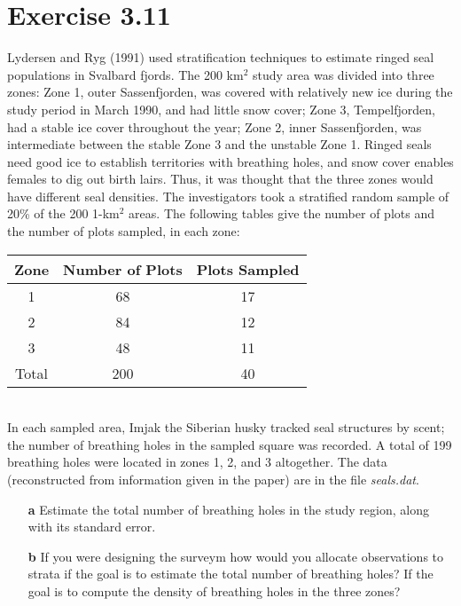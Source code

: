 \documentclass{article}\usepackage{graphicx, color}
\begin{document}
\section*{Exercise 3.11}
Lydersen and Ryg (1991) used stratification techniques to estimate ringed seal populations in Svalbard fjords. The 200 km${}^2$ study area was divided into three zones: Zone 1, outer Sassenfjorden, was covered with relatively new ice during the study period in March 1990, and had little snow cover; Zone 3, Tempelfjorden, had a stable ice cover throughout the year; Zone 2, inner Sassenfjorden, was intermediate between the stable Zone 3 and the unstable Zone 1. Ringed seals need good ice to establish territories with breathing holes, and snow cover enables females to dig out birth lairs. Thus, it was thought that the three zones would have different seal densities. The investigators took a stratified random sample of 20\% of the 200 1-km${}^2$ areas. The following tables give the number of plots and the number of plots sampled, in each zone:\\[10pt]
\begin{tabular}{ccc}
Zone&Number of Plots& Plots Sampled\\
\hline
1&68&17\\
2&84&12\\
3&48&11\\
\hline
Total&200&40\\
\end{tabular}\\[10pt]
In each sampled area, Imjak the Siberian husky tracked seal structures by scent; the number of breathing holes in the sampled square was recorded. A total of 199 breathing holes were located in zones 1, 2, and 3 altogether. The data (reconstructed from information given in the paper) are in the file {\sl seals.dat}.
\begin{enumerate}
  \item[{\bf a}] Estimate the total number of breathing holes in the study region, along with its standard error.
  \item[{\bf b}] If you were designing the surveym how would you allocate observations to strata if the goal is to estimate the total number of breathing holes? If the goal is to compute the density of breathing holes in the three zones?
\end{enumerate}
\end{document}
